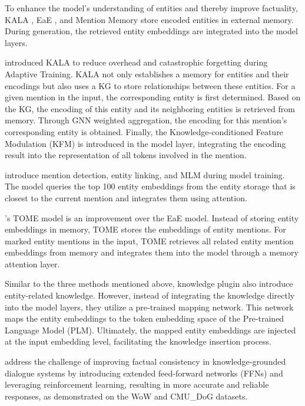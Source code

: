 To enhance the model's understanding of entities and thereby improve factuality, KALA \citep{KALA}, EaE \citep{EaE}, and Mention Memory \citep{jong2022mention} store encoded entities in external memory. During generation, the retrieved entity embeddings are integrated into the model layers.

\citet{KALA} introduced KALA to reduce overhead and catastrophic forgetting during Adaptive Training. KALA not only establishes a memory for entities and their encodings but also uses a KG to store relationships between these entities. For a given mention in the input, the corresponding entity is first determined. Based on the KG, the encoding of this entity and its neighboring entities is retrieved from memory. Through GNN weighted aggregation, the encoding for this mention's corresponding entity is obtained. Finally, the Knowledge-conditioned Feature Modulation (KFM) is introduced in the model layer, integrating the encoding result into the representation of all tokens involved in the mention.

\citet{EaE} introduce mention detection, entity linking, and MLM during model training. The model queries the top 100 entity embeddings from the entity storage that is closest to the current mention and integrates them using attention.

\citet{jong2022mention}'s TOME model is an improvement over the EaE model. Instead of storing entity embeddings in memory, TOME stores the embeddings of entity mentions. For marked entity mentions in the input, TOME retrieves all related entity mention embeddings from memory and integrates them into the model through a memory attention layer.

Similar to the three methods mentioned above, knowledge plugin \citep{zhang-etal-2023-plug} also introduce entity-related knowledge. However, instead of integrating the knowledge directly into the model layers, they utilize a pre-trained mapping network. This network maps the entity embeddings to the token embedding space of the Pre-trained Language Model (PLM). Ultimately, the mapped entity embeddings are injected at the input embedding level, facilitating the knowledge insertion process.

\citet{xue2023improving} address the challenge of improving factual consistency in knowledge-grounded dialogue systems by introducing extended feed-forward networks (FFNs) and leveraging reinforcement learning, resulting in more accurate and reliable responses, as demonstrated on the WoW \citep{WoW} and CMU\_DoG \citep{cmu_dog_emnlp18} datasets.

